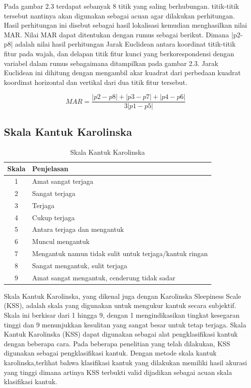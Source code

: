 Pada gambar 2.3 terdapat sebanyak 8 titik yang saling berhubungan. titik-titik tersebut nantinya akan digunakan sebagai acuan agar dilakukan perhitungan. Hasil perhitungan ini disebut sebagai hasil lokalisasi kemudian menghasilkan nilai MAR. Nilai MAR dapat ditentukan dengan rumus sebagai berikut. Dimana |p2-p8| adalah nilai hasil perhitungan Jarak Euclidean antara koordinat titik-titik fitur pada wajah, dan delapan titik fitur kunci yang berkorespondensi dengan variabel dalam rumus sebagaimana ditampilkan pada gambar 2.3. Jarak Euclidean ini dihitung dengan mengambil akar kuadrat dari perbedaan kuadrat koordinat horizontal dan vertikal dari dua titik fitur tersebut\parencite{chandiwala2021driver}.

\begin{equation}
MAR = \frac{|{p2} - {p8}| + |{p3} - {p7}| + |{p4} - {p6}|}{3|{p1} - {p5}|}
\end{equation}


\subsection{Skala Kantuk Karolinska}
\label{subsec:KSS}
\newcommand{\w}{}
\newcommand{\G}{\cellcolor{gray}}
\begin{table}[h!]
  \centering
  \caption{Skala Kantuk Karolinska}
  \begin{tabular}{|c|l|}
    \hline
    Skala \G & Penjelasan \G  \\
    \hline
    1 & Amat sangat terjaga \\
    2 & Sangat terjaga \\
    3 & Terjaga \\
    4 & Cukup terjaga \\
    5 & Antara terjaga dan mengantuk \\
    6 & Muncul mengantuk \\
    7 & Mengantuk namun tidak sulit untuk terjaga/kantuk ringan \\
    8 & Sangat mengantuk, sulit terjaga \\
    9 & Amat sangat mengantuk, cenderung tidak sadar \\
    \hline
  \end{tabular}
  \label{tab:SkalaKSS}
\end{table}


Skala Kantuk Karolinska, yang dikenal juga dengan Karolinska Sleepiness Scale (KSS), adalah skala yang digunakan untuk mengukur kantuk secara subjektif. Skala ini berkisar dari 1 hingga 9, dengan 1 mengindikasikan tingkat kesegaran tinggi dan 9 menunjukkan kesulitan yang sangat besar untuk tetap terjaga. Skala Kantuk Karolinska (KSS) dapat digunakan sebagai alat pengklasifikasi kantuk dengan beberapa cara. Pada beberapa penelitian yang telah dilakukan, KSS digunakan sebagai pengklasifikasi kantuk. Dengan metode skala kantuk karolinska,terlihat bahwa klasifikasi kantuk yang dilakukan memiliki hasil akurasi yang tinggi dimana artinya KSS terbukti valid dijadikan sebagai acuan skala klasifikasi kantuk.

